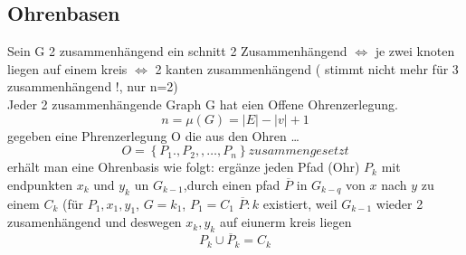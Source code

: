 \documentclass[a4paper]{article}
\theoremstyle{definition}
\theoremstyle{remark}
\begin{document}
\subsection{Ohrenbasen}
\label{sub:ohrenbasen}

Sein G 2 zusammenhängend ein schnitt 2 Zusammenhängend   $\Leftrightarrow$ je zwei knoten liegen auf einem kreis $\Leftrightarrow$ 2 kanten zusammenhängend ( stimmt nicht mehr für 3 zusammenhängend !, nur n=2)\\
Jeder 2 zusammenhängende Graph G hat eien Offene Ohrenzerlegung.\\
\begin{equation*}
n= \mu (G) = |E| -|v|+1
\end{equation*}
gegeben eine Phrenzerlegung O die aus den Ohren \dots
\begin{equation*}
  O= \left\{ P_1.
 ,P_2,,\dots,P_n\right\}
 zusammengesetzt
\end{equation*}
erhält man eine Ohrenbasis wie folgt:
ergänze jeden Pfad (Ohr) $P_k $ mit endpunkten $x_k$ und $y_k$ un $G_{k-1}$,durch einen pfad $\overline{P}$ in $G_{k-q}$ von $x$ nach $y$ zu einem $C_k$ (für $P_1, x_1,y_1$, $G=k_1$, $P_1=C_1$
$\overline{P}:k$ existiert, weil $G_{k-1}$ wieder 2 zusamenhängend  und deswegen $x_k, y_k$ auf eiunerm kreis liegen \\
\begin{equation*}
  P_k \cup \overline{P}_k = C_k
\end{equation*}
\end{document}
